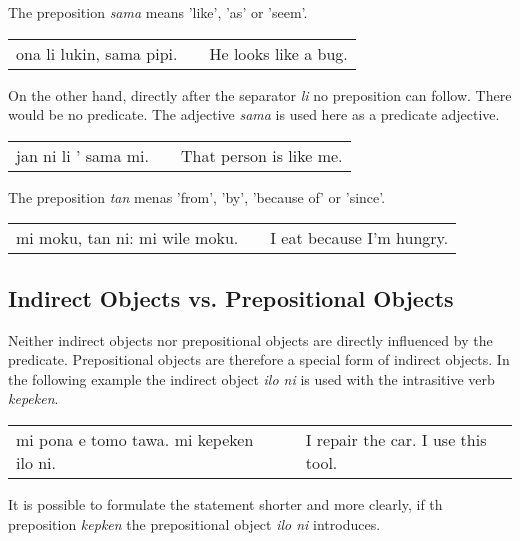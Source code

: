 The preposition \textit{sama} means 'like', 'as' or 'seem'.

\begin{supertabular}{p{5,5cm}|ll}
    ona li lukin, sama pipi. &  & He looks like a bug. \\
\end{supertabular}

On the other hand, directly after the separator \textit{li} no preposition can follow.
There would be no predicate.
The adjective \textit{sama} is used here as a predicate adjective.

\begin{supertabular}{p{5,5cm}|ll}
    jan ni li ' sama mi. &  & That person is like me. \\
\end{supertabular}

The preposition \textit{tan} menas 'from', 'by', 'because of' or 'since'.

\begin{supertabular}{p{5,5cm}|ll}
    mi moku, tan ni: mi wile moku. &  & I eat because I'm hungry. \\
\end{supertabular}

\subsection*{Indirect Objects vs. Prepositional Objects}
Neither indirect objects nor prepositional objects are directly influenced by the predicate.
Prepositional objects are therefore a special form of indirect objects.
In the following example the indirect object \textit{ilo ni} is used with the intrasitive verb \textit{kepeken}.

\begin{supertabular}{p{5,5cm}|ll}
    mi pona e tomo tawa. mi kepeken ilo ni. &  & I repair the car. I use this tool. \\
\end{supertabular}

It is possible to formulate the statement shorter and more clearly, if th preposition \textit{kepken} the prepositional object \textit{ilo ni} introduces.

